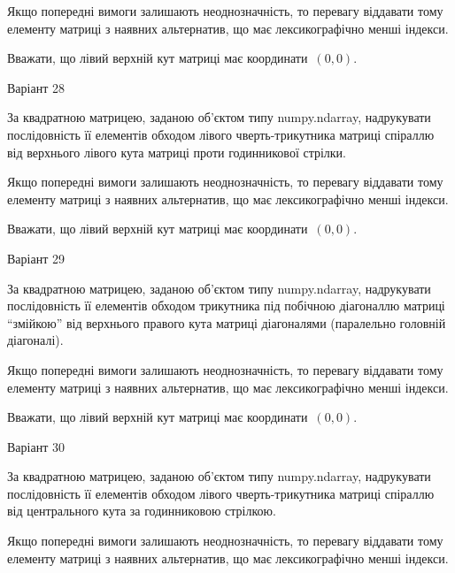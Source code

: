 \documentclass[11pt]{article}
\begin{document}
\vspace{2mm}
Якщо попередні вимоги залишають неоднозначність, то перевагу віддавати тому елементу матриці з наявних альтернатив, що має лексикографічно менші індекси.

Вважати, що лівий верхній кут матриці має координати~$(0,0)$.



{\Large \center  Варіант  28\par \bigskip\bigskip}

За квадратною матрицею, заданою об'єктом типу numpy.ndarray, надрукувати послідовність її елементів обходом лівого чверть-трикутника матриці спіраллю від верхнього лівого кута матриці проти годинникової стрілки.

\vspace{2mm}
Якщо попередні вимоги залишають неоднозначність, то перевагу віддавати тому елементу матриці з наявних альтернатив, що має лексикографічно менші індекси.

Вважати, що лівий верхній кут матриці має координати~$(0,0)$.



{\Large \center  Варіант  29\par \bigskip\bigskip}

За квадратною матрицею, заданою об'єктом типу numpy.ndarray, надрукувати послідовність її елементів обходом трикутника під побічною діагоналлю матриці ``змійкою'' від верхнього правого кута матриці діагоналями (паралельно головній діагоналі).

\vspace{2mm}
Якщо попередні вимоги залишають неоднозначність, то перевагу віддавати тому елементу матриці з наявних альтернатив, що має лексикографічно менші індекси.

Вважати, що лівий верхній кут матриці має координати~$(0,0)$.



{\Large \center  Варіант  30\par \bigskip\bigskip}

За квадратною матрицею, заданою об'єктом типу numpy.ndarray, надрукувати послідовність її елементів обходом лівого чверть-трикутника матриці спіраллю від центрального кута за годинниковою стрілкою.

\vspace{2mm}
Якщо попередні вимоги залишають неоднозначність, то перевагу віддавати тому елементу матриці з наявних альтернатив, що має лексикографічно менші індекси.
\end{document}
